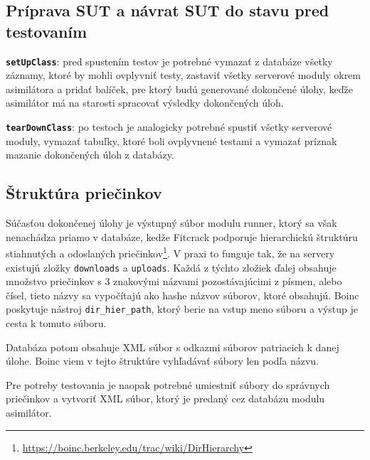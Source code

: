 \subsection*{Príprava SUT a návrat SUT do stavu pred testovaním}
\begin{description}
	\item \textbf{\texttt{setUpClass}}: pred spustením testov je potrebné vymazať z databáze všetky záznamy, ktoré by mohli ovplyvniť testy, zastaviť všetky serverové moduly okrem asimilátora a pridať balíček, pre ktorý budú generované dokončené úlohy, keďže asimilátor má na starosti spracovať výsledky dokončených úloh.
	\item \textbf{\texttt{tearDownClass}}: po testoch je analogicky potrebné spustiť všetky serverové moduly, vymazať tabuľky, ktoré boli ovplyvnené testami a vymazať príznak mazanie dokončených úloh z databázy.
\end{description}

\subsection*{Štruktúra priečinkov}
Súčasťou dokončenej úlohy je výstupný súbor modulu runner, ktorý sa však nenachádza priamo v databáze, kedže Fitcrack podporuje hierarchickú štruktúru stiahnutých a odoslaných priečinkov\footnote{\url{https://boinc.berkeley.edu/trac/wiki/DirHierarchy}}.
V praxi to funguje tak, že na servery existujú zložky \texttt{downloads} a \texttt{uploads}.
Každá z týchto zložiek ďalej obsahuje množstvo priečinkov s 3 znakovými názvami pozostávajúcimi z písmen, alebo čísel, tieto názvy sa vypočítajú ako hashe názvov súborov, ktoré obsahujú.
Boinc poskytuje nástroj \texttt{dir\_hier\_path}, ktorý berie na vstup meno súboru a výstup je cesta k tomuto súboru.

Databáza potom obsahuje XML súbor s odkazmi súborov patriacich k danej úlohe. Boinc viem v tejto štruktúre vyhľadávať súbory len podľa názvu.

Pre potreby testovania je naopak potrebné umiestniť súbory do správnych priečinkov a vytvoriť XML súbor, ktorý je predaný cez databázu modulu asimilátor. \\

